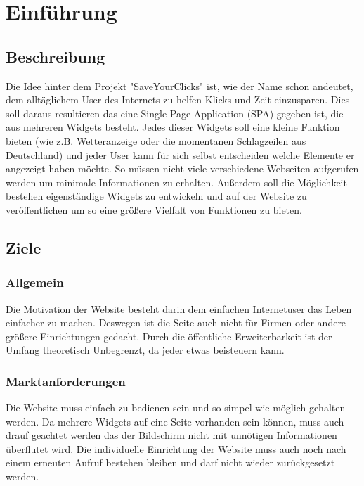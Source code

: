 \newpage

\section{Einführung}

	\subsection{Beschreibung}
	\label{Projektbesch}
		Die Idee hinter dem Projekt "SaveYourClicks" ist, wie der Name schon andeutet, dem alltäglichem User des Internets zu helfen Klicks und Zeit einzusparen. Dies soll daraus resultieren das eine Single Page Application (SPA) gegeben ist, die aus mehreren Widgets besteht. Jedes dieser Widgets soll eine kleine Funktion bieten (wie z.B. Wetteranzeige oder die momentanen Schlagzeilen aus Deutschland) und jeder User kann für sich selbst entscheiden welche Elemente er angezeigt haben möchte. So müssen nicht viele verschiedene Webseiten aufgerufen werden um minimale Informationen zu erhalten. 
		Außerdem soll die Möglichkeit bestehen eigenständige Widgets zu entwickeln und auf der Website zu veröffentlichen um so eine größere Vielfalt von Funktionen zu bieten.
	
	\subsection{Ziele}
	\label{ziel}
	
		\subsubsection{Allgemein}
			Die Motivation der Website besteht darin dem einfachen Internetuser das Leben einfacher zu machen. Deswegen ist die Seite auch nicht für Firmen oder andere größere Einrichtungen gedacht. Durch die öffentliche Erweiterbarkeit ist der Umfang theoretisch Unbegrenzt, da jeder etwas beisteuern kann.
			
		\subsubsection{Marktanforderungen}  
			Die Website muss einfach zu bedienen sein und so simpel wie möglich gehalten werden. Da mehrere Widgets auf eine Seite vorhanden sein können, muss auch drauf geachtet werden das der Bildschirm nicht mit unnötigen Informationen überflutet wird. Die individuelle Einrichtung der Website muss auch noch nach einem erneuten Aufruf bestehen bleiben und darf nicht wieder zurückgesetzt werden.
			
